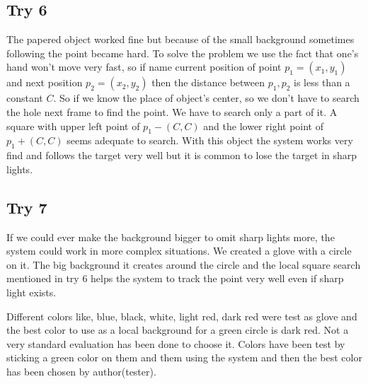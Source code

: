 \documentclass{report}
\begin{document}
\subsection{Try 6}
The papered object worked fine but because of the small background sometimes following the point became hard. To solve the problem we use the fact that one's hand won't move very fast, so if name current position of point $p_1 = (x_1, y_1)$ and next position $p_2 = (x_2, y_2)$ then the distance between $p_1, p_2$ is less than a constant $C$. So if we know the place of object's center, so we don't have to search the hole next frame to find the point. We have to search only a part of it. A square with upper left point of $p_1 - (C, C)$ and the lower right point of $p_1 + (C, C)$ seems adequate to search. With this object the system works very find and follows the target very well but it is common to lose the target in sharp lights.
\subsection{Try 7}
If we could ever make the background bigger to omit sharp lights more, the system could work in more complex situations. We created a glove with a circle on it. The big background it creates around the circle and the local square search mentioned in try 6 helps the system to track the point very well even if sharp light exists. 

 Different colors like, blue, black, white, light red, dark red were test as glove and the best color to use as a local background for a green circle is dark red. Not a very standard evaluation has been done to choose it. Colors have been test by sticking a green color on them and them using the system and then the best color has been chosen by author(tester). 
\end{document}
